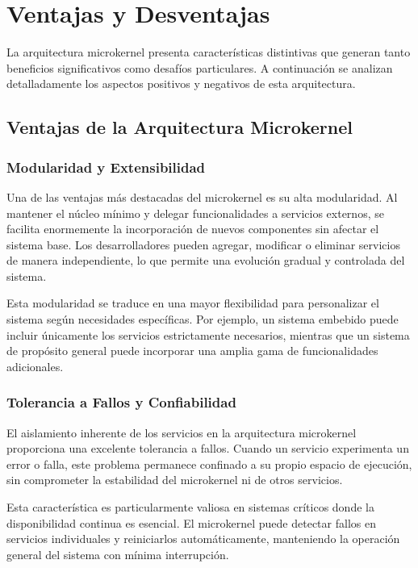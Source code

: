 \documentclass[12pt,a4paper]{article}
\begin{document}
\section{Ventajas y Desventajas}

La arquitectura microkernel presenta características distintivas que generan tanto beneficios significativos como desafíos particulares. A continuación se analizan detalladamente los aspectos positivos y negativos de esta arquitectura.

\subsection{Ventajas de la Arquitectura Microkernel}

\subsubsection{Modularidad y Extensibilidad}

Una de las ventajas más destacadas del microkernel es su alta modularidad. Al mantener el núcleo mínimo y delegar funcionalidades a servicios externos, se facilita enormemente la incorporación de nuevos componentes sin afectar el sistema base. Los desarrolladores pueden agregar, modificar o eliminar servicios de manera independiente, lo que permite una evolución gradual y controlada del sistema.

Esta modularidad se traduce en una mayor flexibilidad para personalizar el sistema según necesidades específicas. Por ejemplo, un sistema embebido puede incluir únicamente los servicios estrictamente necesarios, mientras que un sistema de propósito general puede incorporar una amplia gama de funcionalidades adicionales.

\subsubsection{Tolerancia a Fallos y Confiabilidad}

El aislamiento inherente de los servicios en la arquitectura microkernel proporciona una excelente tolerancia a fallos. Cuando un servicio experimenta un error o falla, este problema permanece confinado a su propio espacio de ejecución, sin comprometer la estabilidad del microkernel ni de otros servicios.

Esta característica es particularmente valiosa en sistemas críticos donde la disponibilidad continua es esencial. El microkernel puede detectar fallos en servicios individuales y reiniciarlos automáticamente, manteniendo la operación general del sistema con mínima interrupción.
\end{document}
